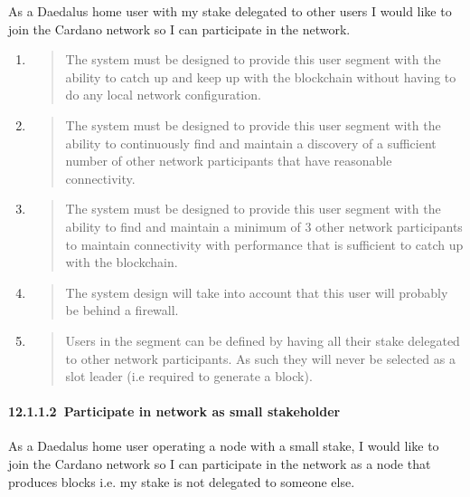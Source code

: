 \documentclass[11pt,a4paper]{article}
\begin{document}
As a Daedalus home user with my stake delegated to other users I would
like to join the Cardano network so I can participate in the network.

\begin{enumerate}
\def\labelenumi{\arabic{enumi}.}
\item
  \begin{quote}
  The system must be designed to provide this user segment with the
  ability to catch up and keep up with the blockchain without having to
  do any local network configuration.
  \end{quote}
\item
  \begin{quote}
  The system must be designed to provide this user segment with the
  ability to continuously find and maintain a discovery of a sufficient
  number of other network participants that have reasonable
  connectivity.
  \end{quote}
\item
  \begin{quote}
  The system must be designed to provide this user segment with the
  ability to find and maintain a minimum of 3 other network participants
  to maintain connectivity with performance that is sufficient to catch
  up with the blockchain.
  \end{quote}
\item
  \begin{quote}
  The system design will take into account that this user will probably
  be behind a firewall.
  \end{quote}
\item
  \begin{quote}
  Users in the segment can be defined by having all their stake
  delegated to other network participants. As such they will never be
  selected as a slot leader (i.e required to generate a block).
  \end{quote}
\end{enumerate}

\hypertarget{participate-in-network-as-small-stakeholder}{%
\paragraph{​12.1.1.2​~Participate in network as small stakeholder
}\label{participate-in-network-as-small-stakeholder}}

As a Daedalus home user operating a node with a small stake, I would
like to join the Cardano network so I can participate in the network as
a node that produces blocks i.e. my stake is not delegated to someone
else.
\end{document}
